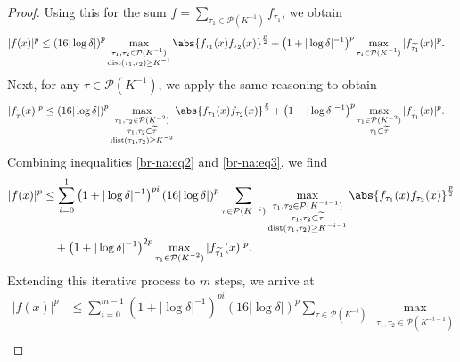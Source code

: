 \documentclass[reqno,centertags,11pt,a4paper]{amsart}
\begin{document}
\begin{proof}
Using this for the sum $f = \sum_{\tau_1 \in \mathcal{P}(K^{-1})} f_{\tau_1}$, we obtain
\begin{align}\label{br-na:eq2}
    |f(x)|^p &\leq \left(16|\log\delta|\right)^p
        \max_{\substack{ \tau_1,\tau_2 \in \mathcal{P}(K^{-1})  \\
                        \operatorname{dist}(\tau_1,\tau_2) \geq  K^{-1} }}
        \abs{f_{\tau_1}(x)f_{\tau_2}(x)}^{\frac{p}{2}}
        + \left(1+|\log\delta|^{-1}\right)^p
        \max_{\substack{ \tau_1 \in \mathcal{P}(K^{-1})}} |f_{\widetilde{\tau_1}}(x)|^p.
\end{align}
Next, for any $\tau\in\mathcal{P}(K^{-1})$, we apply the same reasoning to obtain
\begin{align}\label{br-na:eq3}
    |f_{\widetilde{\tau}}(x)|^p &\leq \left(16|\log\delta|\right)^p
        \max_{\substack{ \tau_1,\tau_2 \in \mathcal{P}(K^{-2})  \\
                        \tau_1,\tau_2\subset\widetilde{\tau}\\
                        \operatorname{dist}(\tau_1,\tau_2) \geq  K^{-2} }}
        \abs{f_{\tau_1}(x)f_{\tau_2}(x)}^{\frac{p}{2}}
        + \left(1+|\log\delta|^{-1}\right)^p
        \max_{\substack{ \tau_1 \in \mathcal{P}(K^{-2})\\
                        \tau_1\subset\widetilde{\tau }}} |f_{\widetilde{\tau_1}}(x)|^p.
\end{align}
Combining inequalities \eqref{br-na:eq2} and \eqref{br-na:eq3}, we find
\begin{align*}
|f(x)|^p &\leq \sum_{i=0}^1 \left(1+|\log\delta|^{-1}\right)^{pi} \left(16|\log\delta|\right)^p
    \sum_{\tau\in\mathcal{P}(K^{-i})}
    \max_{\substack{ \tau_1,\tau_2 \in \mathcal{P}(K^{-i-1}) \\
                    \tau_1,\tau_2 \subset {\widetilde{\tau}} \\
                    \operatorname{dist}(\tau_1,\tau_2) \geq  K^{-i-1} }}
    \abs{f_{\tau_1}(x)f_{\tau_2}(x)}^{\frac{p}{2}}\\
&\quad + \left(1+|\log\delta|^{-1}\right)^{2p}
    \max_{\substack{ \tau_1 \in \mathcal{P}(K^{-2}) }} |f_{\widetilde{\tau_1}}(x)|^p.
\end{align*}
Extending this iterative process to $m$ steps, we arrive at
\begin{align*}
|f(x)|^p
& \leq \sum_{i=0}^{m-1} \left(1+|\log\delta|^{-1}\right)^{pi} \left(16|\log\delta|\right)^p
    \sum_{\tau\in\mathcal{P}(K^{-i})}
    \max_{\substack{ \tau_1,\tau_2 \in \mathcal{P}(K^{-i-1}) \\
}}
\end{align*}
\end{proof}
\end{document}
